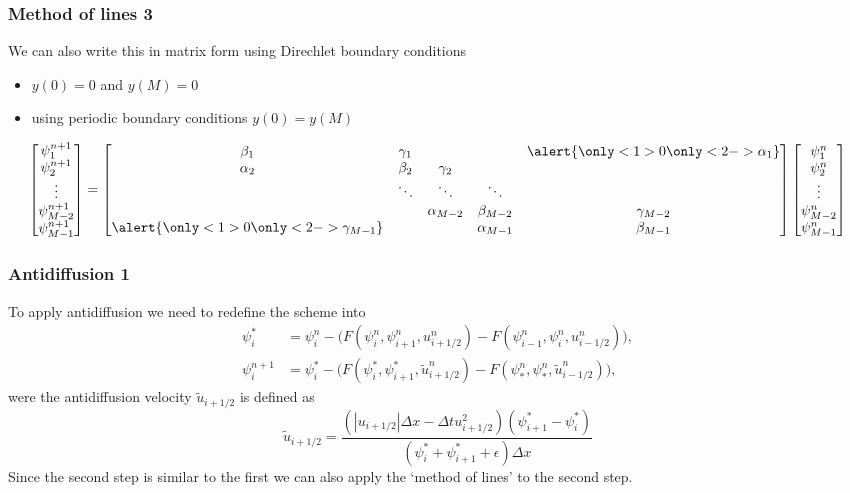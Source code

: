 \documentclass[hyperref={pdfstartview=Fit}]{beamer}
\providecommand{\abs}[1]{\left\lvert#1\right\rvert}
\begin{document}
\begin{frame}
\frametitle{Method of lines 3}
We can also write this in matrix form using Direchlet boundary conditions
\begin{itemize}
\item {}\alert{$y(0)=0$ and $y(M)=0$}
\item {}\alert{using periodic boundary conditions $y(0)=y(M)$}
\end{itemize}
\begin{equation*}
\begin{bmatrix}\psi_{1}^{n+1}\\\psi_{2}^{n+1}\\ \vdots \\\psi_{M-2}^{n+1}\\\psi_{M-1}^{n+1}\end{bmatrix} =
\begin{bmatrix}\beta_1&\gamma_1&&&\alert{\only<1>{0}\only<2->{\alpha_1}}\\ \alpha_2&\beta_2&\gamma_2\\ &\ddots&\ddots&\ddots\\&&\alpha_{M-2}&\beta_{M-2}&\gamma_{M-2}\\\alert{\only<1>{0}\only<2->{\gamma_{M-1}}}&&&\alpha_{M-1}&\beta_{M-1}\\ \end{bmatrix}
\begin{bmatrix}\psi_{1}^n\\\psi_{2}^n\\ \vdots \\\psi_{M-2}^n\\\psi_{M-1}^n\end{bmatrix}
\end{equation*}
\end{frame}

\begin{frame}
\frametitle{Antidiffusion 1}
To apply antidiffusion we need to redefine the scheme into
\begin{align*}
 \psi_i^{*} &= \psi_i^n - \Big( F \left( \psi_i^n,\psi_{i+1}^n,u_{i+1/2}^n\right)
-F \left( \psi_{i-1}^n,\psi_{i}^n,u_{i-1/2}^n\right) \Big),\\
 \psi_i^{n+1} &= \psi_i^* - \Big( F \left( \psi_i^*,\psi_{i+1}^*,\tilde{u}_{i+1/2}^n\right)
-F \left( \psi_{*}^n,\psi_{*}^n,\tilde{u}_{i-1/2}^n\right) \Big),\
\end{align*}
were the antidiffusion velocity $\tilde{u}_{i+1/2}$ is defined as
\begin{equation*}
\tilde{u}_{i+1/2} = \frac{\left(\abs{u_{i+1/2}}\Delta x - \Delta t u_{i+1/2}^2 \right) \left( \psi_{i+1}^*-\psi_i^*\right)}{ \left( \psi_i^*+\psi_{i+1}^*+\epsilon \right) \Delta x}
\end{equation*}
Since the second step is similar to the first we can also apply the `method of lines' to the second step.
\end{frame}
\end{document}
